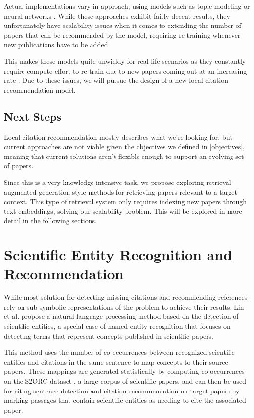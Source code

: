 \documentclass[12pt,a4paper]{report}
\begin{document}
Actual implementations vary in approach, using models such as topic modeling \cite{He2010ContextawareCR} or neural networks \cite{Tang2014CrosslanguageCC, Ebesu2017NeuralCN}. While these approaches exhibit fairly decent results, they unfortunately have scalability issues when it comes to extending the number of papers that can be recommended by the model, requiring re-training whenever new publications have to be added.

This makes these models quite unwieldy for real-life scenarios as they constantly require compute effort to re-train due to new papers coming out at an increasing rate \cite{increasing-yearly-publications}. Due to these issues, we will pursue the design of a new local citation recommendation model.

\subsection{Next Steps}

Local citation recommendation mostly describes what we're looking for, but current approaches are not viable given the objectives we defined in \autoref{objectives}, meaning that current solutions aren't flexible enough to support an evolving set of papers.

Since this is a very knowledge-intensive task, we propose exploring retrieval-augmented generation \cite{Lewis2020RetrievalAugmentedGF} style methods for retrieving papers relevant to a target context. This type of retrieval system only requires indexing new papers through text embeddings, solving our scalability problem. This will be explored in more detail in the following sections.

\section{Scientific Entity Recognition and Recommendation}

While most solution for detecting missing citations and recommending references rely on sub-symbolic representations of the problem to achieve their results, Lin et al. \cite{Lin2022DetectingAA} propose a natural language processing method based on the detection of scientific entities, a special case of named entity recognition \cite{Lample2016NeuralAF} that focuses on detecting terms that represent concepts published in scientific papers.

This method uses the number of co-occurrences between recognized scientific entities and citations in the same sentence to map concepts to their source papers. These mappings are generated statistically by computing co-occurrences on the S2ORC dataset \cite{Lo2020S2ORCTS}, a large corpus of scientific papers, and can then be used for citing sentence detection and citation recommendation on target papers by marking passages that contain scientific entities as needing to cite the associated paper. 
\end{document}
